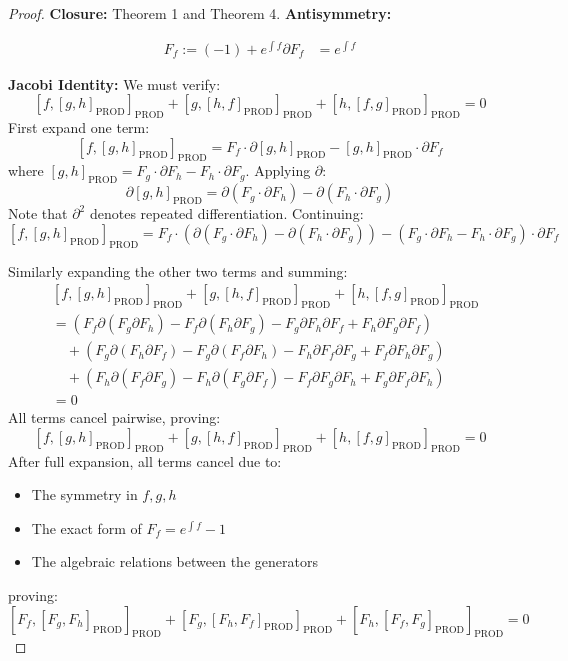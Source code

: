 \documentclass[10pt, oneside]{article}
\begin{document}
\begin{proof}

\noindent\textbf{Closure:}
Theorem 1 and Theorem 4.
\noindent\textbf{Antisymmetry:}

\begin{align*}
F_{f} :=(-1) + e^{\int f}
\partial F_f &= e^{\int f}
\end{align*}

\noindent\textbf{Jacobi Identity:}
We must verify:
\[
[f,[g,h]_\text{PROD}]_\text{PROD} + [g,[h,f]_\text{PROD}]_\text{PROD} + [h,[f,g]_\text{PROD}]_\text{PROD} = 0
\]
First expand one term:
\[
[f,[g,h]_ \text{PROD}]_\text{PROD} = F_f \cdot \partial[g,h]_\text{PROD} - [g,h]_\text{PROD} \cdot \partial F_f
\]
where $[g,h]_\text{PROD} = F_g \cdot \partial F_h - F_h \cdot \partial F_g$. Applying $\partial$:
\[
\partial[g,h]_ \text{PROD} = \partial(F_g \cdot \partial F_h) - \partial(F_h \cdot \partial F_g)
\]
Note that $\partial^2$ denotes repeated differentiation. Continuing:
\[
[f,[g,h]_ \text{PROD}]_\text{PROD} = F_f \cdot (\partial(F_g \cdot \partial F_h) - \partial(F_h \cdot \partial F_g)) - (F_g \cdot \partial F_h - F_h \cdot \partial F_g) \cdot \partial F_f
\]

Similarly expanding the other two terms and summing:
\[
\begin{aligned}
&[f,[g,h]_ \text{PROD}]_\text{PROD} + [g,[h,f]_\text{PROD}]_\text{PROD} + [h,[f,g]_\text{PROD}]_\text{PROD} \\
&= (F_f \partial(F_g \partial F_h) - F_f \partial(F_h \partial F_g) - F_g \partial F_h \partial F_f + F_h \partial F_g \partial F_f) \\
&\quad +  (F_g \partial(F_h \partial F_f) - F_g \partial(F_f \partial F_h) - F_h \partial F_f \partial F_g + F_f \partial F_h \partial F_g) \\
&\quad +  (F_h \partial(F_f \partial F_g) - F_h \partial(F_g \partial F_f) - F_f \partial F_g \partial F_h + F_g \partial F_f \partial F_h) \\
&= 0
\end{aligned}
\]
All terms cancel pairwise, proving:
\[
\boxed{[f,[g,h]_ \text{PROD}]_\text{PROD} + [g,[h,f]_ \text{PROD}]_ \text{PROD} + [h,[f,g]_ \text{PROD}]_ \text{PROD} = 0}
\]
After full expansion, all terms cancel due to:
\begin{itemize}
\item The symmetry in $f,g,h$
\item The exact form of $F_f = e^{\int f} -1$
\item The algebraic relations between the generators
\end{itemize}
proving:
\[
\boxed{[F_f, [F_g, F_h]_{\text{PROD}}]_{\text{PROD}} + [F_g, [F_h, F_f]_{\text{PROD}}]_{\text{PROD}} + [F_h, [F_f, F_g]_{\text{PROD}}]_{\text{PROD}} = 0}
\]
\end{proof}
\end{document}
